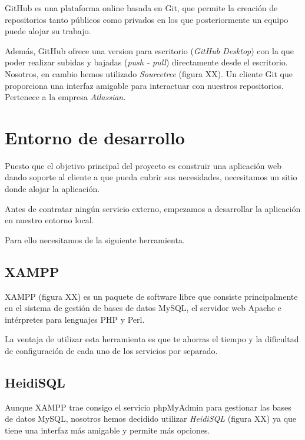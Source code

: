 
GitHub es una plataforma online basada en Git, que permite la creación de repositorios tanto públicos como privados en los que posteriormente un equipo puede alojar su trabajo.

Además, GitHub ofrece una version para escritorio (\textit{GitHub Desktop}) con la que poder realizar subidas y bajadas (\textit{push - pull}) directamente desde el escritorio. Nosotros, en cambio hemos utilizado \textit{Sourcetree} (figura XX). Un cliente Git que proporciona una interfaz amigable para interactuar con nuestros repositorios. Pertenece a la empresa \textit{Atlassian.}


\newpage

\section{Entorno de desarrollo}

Puesto que el objetivo principal del proyecto es construir una aplicación web dando soporte al cliente a que pueda cubrir sus necesidades, necesitamos un sitio donde alojar la aplicación. 

Antes de contratar ningún servicio externo, empezamos a desarrollar la aplicación en nuestro entorno local. 

Para ello necesitamos de la siguiente herramienta.

\subsection{XAMPP}

XAMPP (figura XX) es un paquete de software libre que consiste principalmente en el sistema de gestión de bases de datos MySQL, el servidor web Apache e intérpretes para lenguajes PHP y Perl. \cite{wiki:xampp}

La ventaja de utilizar esta herramienta es que te ahorras el tiempo y la dificultad de configuración de cada uno de los servicios por separado. 


\subsection{HeidiSQL}

Aunque XAMPP trae consigo el servicio phpMyAdmin para gestionar las bases de datos MySQL, nosotros hemos decidido utilizar \textit{HeidiSQL} (figura XX) ya que tiene una interfaz más amigable y permite más opciones.

